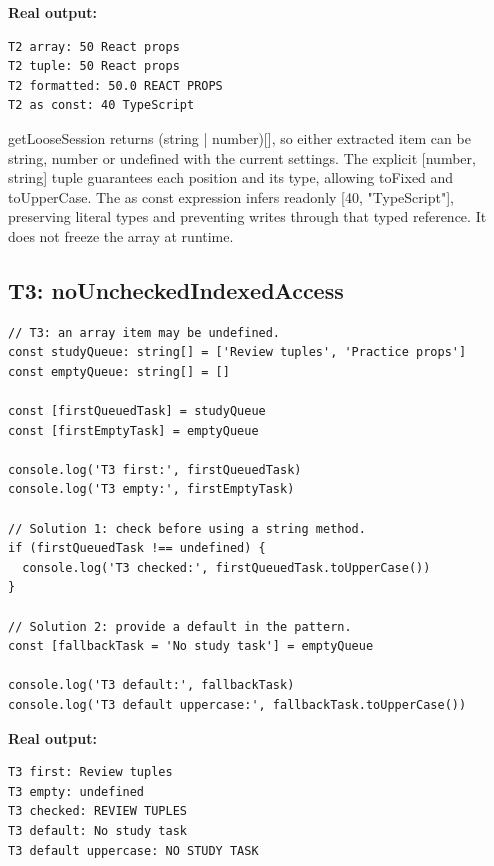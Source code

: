 \documentclass[10pt,a4paper]{article}
\begin{document}

\textbf{Real output:}

\begin{lstlisting}[language={}]
T2 array: 50 React props
T2 tuple: 50 React props
T2 formatted: 50.0 REACT PROPS
T2 as const: 40 TypeScript
\end{lstlisting}

getLooseSession returns (string | number)[], so either extracted item can be string, number or undefined with the current settings. The explicit [number, string] tuple guarantees each position and its type, allowing toFixed and toUpperCase. The as const expression infers readonly [40, "TypeScript"], preserving literal types and preventing writes through that typed reference. It does not freeze the array at runtime.

\subsection{T3: noUncheckedIndexedAccess}

\begin{lstlisting}[language=GuideJS]
// T3: an array item may be undefined.
const studyQueue: string[] = ['Review tuples', 'Practice props']
const emptyQueue: string[] = []

const [firstQueuedTask] = studyQueue
const [firstEmptyTask] = emptyQueue

console.log('T3 first:', firstQueuedTask)
console.log('T3 empty:', firstEmptyTask)

// Solution 1: check before using a string method.
if (firstQueuedTask !== undefined) {
  console.log('T3 checked:', firstQueuedTask.toUpperCase())
}

// Solution 2: provide a default in the pattern.
const [fallbackTask = 'No study task'] = emptyQueue

console.log('T3 default:', fallbackTask)
console.log('T3 default uppercase:', fallbackTask.toUpperCase())
\end{lstlisting}


\textbf{Real output:}

\begin{lstlisting}[language={}]
T3 first: Review tuples
T3 empty: undefined
T3 checked: REVIEW TUPLES
T3 default: No study task
T3 default uppercase: NO STUDY TASK
\end{lstlisting}
\end{document}
